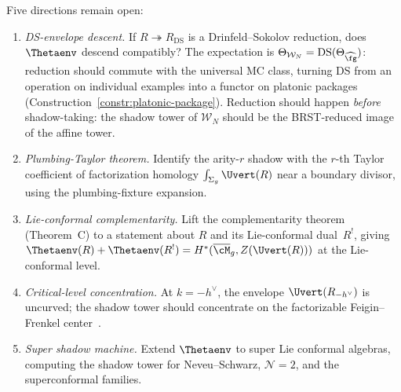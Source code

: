 \begin{remark}
\label{rem:envelope-shadow-frontier}
Five directions remain open:
\begin{enumerate}[label=\textup{(\roman*)},nosep]
\item \emph{DS-envelope descent.}
  If $R \twoheadrightarrow R_{\mathrm{DS}}$ is a
  Drinfeld--Sokolov reduction, does $\Thetaenv$ descend
  compatibly?  The expectation is
  $\Theta_{\mathcal{W}_N} = \mathrm{DS}(\Theta_{\widehat{\fg}})$:
  reduction should commute with the universal MC class,
  turning DS from an operation on individual examples into
  a functor on platonic packages
  (Construction~\ref{constr:platonic-package}).
  Reduction should happen \emph{before} shadow-taking:
  the shadow tower of $\mathcal{W}_N$ should be the
  BRST-reduced image of the affine tower.
\item \emph{Plumbing-Taylor theorem.}
  Identify the arity-$r$ shadow with the $r$-th Taylor
  coefficient of factorization homology
  $\int_{\Sigma_g} \Uvert(R)$ near a boundary divisor,
  using the plumbing-fixture expansion.
\item \emph{Lie-conformal complementarity.}
  Lift the complementarity theorem (Theorem~C) to a statement
  about $R$ and its Lie-conformal dual~$R^!$, giving
  $\Thetaenv(R) + \Thetaenv(R^!) = H^*(\overline{\cM}_g,
  Z(\Uvert(R)))$ at the Lie-conformal level.
\item \emph{Critical-level concentration.}
  At $k = -h^\vee$, the envelope
  $\Uvert(R_{-h^\vee})$ is uncurved; the shadow
  tower should concentrate on the factorizable
  Feigin--Frenkel center~\cite{CM25}.
\item \emph{Super shadow machine.}
  Extend $\Thetaenv$ to super Lie conformal algebras,
  computing the shadow tower for Neveu--Schwarz,
  $\mathcal{N}=2$, and the superconformal families.
\end{enumerate}
\end{remark}

